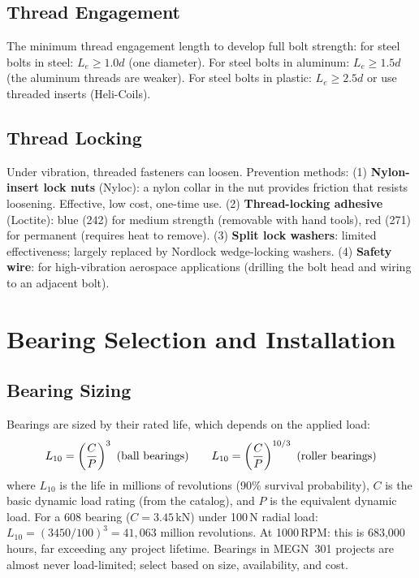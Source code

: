 \documentclass[11pt,letterpaper,twoside,openany]{book}
\begin{document}
\subsection{Thread Engagement}
The minimum thread engagement length to develop full bolt strength: for steel bolts in steel: $L_e \geq 1.0d$ (one diameter). For steel bolts in aluminum: $L_e \geq 1.5d$ (the aluminum threads are weaker). For steel bolts in plastic: $L_e \geq 2.5d$ or use threaded inserts (Heli-Coils).

\subsection{Thread Locking}
Under vibration, threaded fasteners can loosen. Prevention methods: (1) \textbf{Nylon-insert lock nuts} (Nyloc): a nylon collar in the nut provides friction that resists loosening. Effective, low cost, one-time use. (2) \textbf{Thread-locking adhesive} (Loctite): blue (242) for medium strength (removable with hand tools), red (271) for permanent (requires heat to remove). (3) \textbf{Split lock washers}: limited effectiveness; largely replaced by Nordlock wedge-locking washers. (4) \textbf{Safety wire}: for high-vibration aerospace applications (drilling the bolt head and wiring to an adjacent bolt).

\section{Bearing Selection and Installation}
\subsection{Bearing Sizing}
Bearings are sized by their rated life, which depends on the applied load:
\begin{equation}
L_{10} = \left(\frac{C}{P}\right)^3 \text{ (ball bearings\index{ball bearing})} \qquad L_{10} = \left(\frac{C}{P}\right)^{10/3} \text{ (roller bearings\index{roller bearing})}
\end{equation}
where $L_{10}$ is the life in millions of revolutions (90\% survival probability), $C$ is the basic dynamic load rating (from the catalog), and $P$ is the equivalent dynamic load. For a 608 bearing ($C = 3.45$\,kN) under 100\,N radial load: $L_{10} = (3450/100)^3 = 41{,}063$ million revolutions. At 1000\,RPM: this is 683,000 hours, far exceeding any project lifetime. Bearings in MEGN~301 projects are almost never load-limited; select based on size, availability, and cost.
\end{document}
